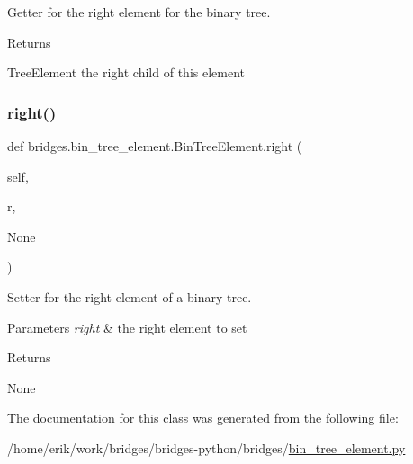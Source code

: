 Getter for the right element for the binary tree. 

\begin{DoxyReturn}{Returns}


Tree\+Element the right child of this element 
\end{DoxyReturn}
\mbox{\label{classbridges_1_1bin__tree__element_1_1_bin_tree_element_a8a009b8fe2744859abc8bfe89ccce697}} 
\subsubsection{\texorpdfstring{right()}{right()}\hspace{0.1cm}{\footnotesize\ttfamily [2/2]}}
{\footnotesize\ttfamily def bridges.\+bin\+\_\+tree\+\_\+element.\+Bin\+Tree\+Element.\+right (\begin{DoxyParamCaption}\item[{}]{self,  }\item[{}]{r,  }\item[{}]{None }\end{DoxyParamCaption})}



Setter for the right element of a binary tree. 


\begin{DoxyParams}{Parameters}
{\em right} & the right element to set \\
\hline
\end{DoxyParams}
\begin{DoxyReturn}{Returns}


None 
\end{DoxyReturn}


The documentation for this class was generated from the following file\+:\begin{DoxyCompactItemize}
\item 
/home/erik/work/bridges/bridges-\/python/bridges/\hyperlink{bin__tree__element_8py}{bin\+\_\+tree\+\_\+element.\+py}\end{DoxyCompactItemize}
